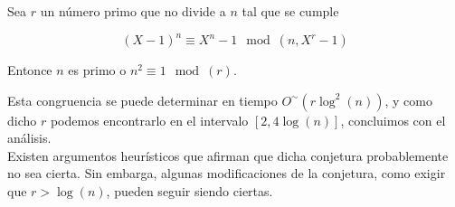 \begin{conjetura}
	Sea $r$ un número primo que no divide a $n$ tal que se cumple
	
	\begin{equation}
	(X - 1)^n \equiv X^n - 1 \mod(n, X^r - 1)
	\end{equation}
	
	Entonce $n$ es primo o $n^2 \equiv 1 \mod(r)$.
\end{conjetura}

Esta congruencia se puede determinar en tiempo $O^\sim(r\log^2(n))$, y como dicho $r$ podemos encontrarlo en el intervalo $[2, 4\log(n)]$, concluimos con el análisis.\\

Existen argumentos heurísticos que afirman que dicha conjetura probablemente no sea cierta. Sin embarga, algunas modificaciones de la conjetura, como exigir que $r > \log(n)$, pueden seguir siendo ciertas.

\endinput
